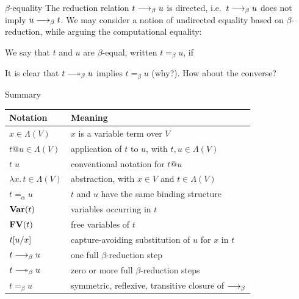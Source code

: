 \begin{frame}{$\beta$-equality}
  The reduction relation $t \longrightarrow_{\beta} u$ is \alert{directed}, i.e.\ $t \longrightarrow_{\beta} u$ does not imply $u \longrightarrow_{\beta} t$.
  We may consider a notion of \alert{undirected equality} based on $\beta$-reduction, while arguing the computational equality:
  \begin{definition}
    We say that $t$ and $u$ are $\beta$-equal, written $t =_\beta u$, if 
  \end{definition}
  It is clear that $t\reduce u$ implies $t =_\beta u$ (why?). 
  How about the converse?
\end{frame}

\begin{frame}{Summary}
  \begin{center}
    \renewcommand{\arraystretch}{1.2}
    \begin{tabular}{@{}ll@{}}
      \toprule
      \textbf{Notation} & \textbf{Meaning} \\
      \midrule
      $x \in \Lambda(V)$
        & $x$ is a variable term over $V$ \\

      $t @ u \in \Lambda(V)$
        & application of $t$ to $u$, with $t, u\in \Lambda(V)$ \\

      $t\;u$ & conventional notation for \(t @ u\) \\

      $\lambda x.\,t \in \Lambda(V)$
        & abstraction, with $x \in V$ and $t \in \Lambda(V)$ \\

      $t =_\alpha u$
        & $t$ and $u$ have the same binding structure \\

      $\mathbf{Var}(t)$
        & variables occurring in $t$ \\

      $\mathbf{FV}(t)$
        & free variables of $t$ \\

      $t[{u}/{x}]$
        & capture-avoiding substitution of $u$ for $x$ in $t$ \\

      $t \longrightarrow_{\beta} u$
        & one full $\beta$-reduction step \\

      $t \reduce u$
        & zero or more full $\beta$-reduction steps \\

      $t =_\beta u$
        & symmetric, reflexive, transitive closure of $\longrightarrow_{\beta}$ \\
      \bottomrule
    \end{tabular}
  \end{center}
\end{frame}


